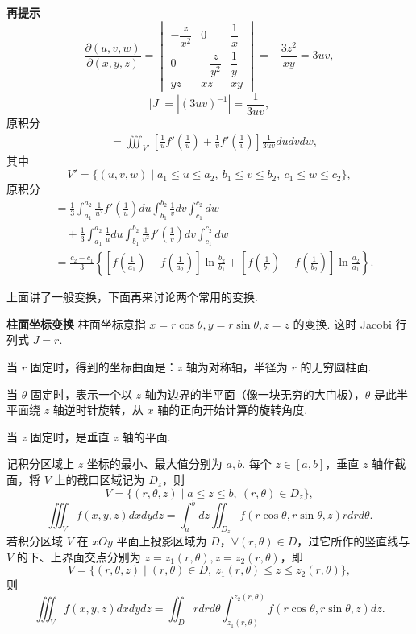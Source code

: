 \documentclass[UTF8,12pt,a4paper,fontset=fandol]{ctexart}
\begin{document}
\noindent\textbf{再提示}\quad
\[
\frac{\partial(u,v,w)}{\partial(x,y,z)}
=\begin{vmatrix}
-\dfrac z{x^2}&0&\dfrac1x\\
0&-\dfrac z{y^2}&\dfrac1y\\
yz&xz&xy
\end{vmatrix}
=-\frac{3z^2}{xy}=3uv,
\]
\[
|J|=|(3uv)^{-1}|=\frac1{3uv},
\]
原积分
\[
\begin{aligned}
&=\iiint_{V'}\left[\frac1u f'\left(\frac1u\right)+
\frac1v f'\left(\frac1v\right)\right]\frac1{3uv}dudvdw,
\end{aligned}
\]
其中
\[
V'=\{(u,v,w)\mid a_1\le u\le a_2,\ b_1\le v\le b_2,\ c_1\le w\le c_2\},
\]
原积分
\[
\begin{aligned}
&=\frac13\int_{a_1}^{a_2}\frac1{u^2}f'\left(\frac1u\right)du
\int_{b_1}^{b_2}\frac1v dv\int_{c_1}^{c_2}dw\\
&\quad+\frac13\int_{a_1}^{a_2}\frac1u du
\int_{b_1}^{b_2}\frac1{v^2}f'\left(\frac1v\right)dv\int_{c_1}^{c_2}dw\\
&=\frac{c_2-c_1}3\left\{
\left[f\left(\frac1{a_1}\right)-f\left(\frac1{a_2}\right)\right]\ln\frac{b_2}{b_1}
+\left[f\left(\frac1{b_1}\right)-f\left(\frac1{b_2}\right)\right]\ln\frac{a_2}{a_1}\right\}.
\end{aligned}
\]

上面讲了一般变换，下面再来讨论两个常用的变换.

\noindent\textbf{柱面坐标变换}\quad
柱面坐标意指 $x=r\cos\theta,y=r\sin\theta,z=z$ 的变换. 这时 Jacobi 行列式 $J=r$.

当 $r$ 固定时，得到的坐标曲面是：$z$ 轴为对称轴，半径为 $r$ 的无穷圆柱面.

当 $\theta$ 固定时，表示一个以 $z$ 轴为边界的半平面（像一块无穷的大门板），$\theta$ 是此半平面绕 $z$ 轴逆时针旋转，从 $x$ 轴的正向开始计算的旋转角度.

当 $z$ 固定时，是垂直 $z$ 轴的平面.

记积分区域上 $z$ 坐标的最小、最大值分别为 $a,b$. 每个 $z\in[a,b]$，垂直 $z$ 轴作截面，将 $V$ 上的截口区域记为 $D_z$，则
\[
V=\{(r,\theta,z)\mid a\le z\le b,\ (r,\theta)\in D_z\},
\]
\[
\iiint_Vf(x,y,z)dxdydz
=\int_a^bdz\iint_{D_z}f(r\cos\theta,r\sin\theta,z)rdrd\theta.
\]
若积分区域 $V$ 在 $xOy$ 平面上投影区域为 $D$，$\forall(r,\theta)\in D$，过它所作的竖直线与 $V$ 的下、上界面交点分别为 $z=z_1(r,\theta),z=z_2(r,\theta)$，即
\[
V=\{(r,\theta,z)\mid (r,\theta)\in D,\ z_1(r,\theta)\le z\le z_2(r,\theta)\},
\]
则
\[
\iiint_Vf(x,y,z)dxdydz
=\iint_Drdrd\theta\int_{z_1(r,\theta)}^{z_2(r,\theta)}
f(r\cos\theta,r\sin\theta,z)dz.
\]
\end{document}
